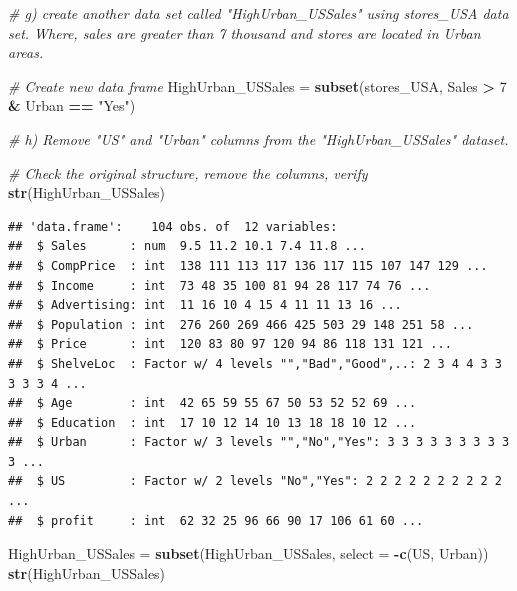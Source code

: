\documentclass[
]{article}
\newenvironment{Shaded}{\begin{snugshade}}{\end{snugshade}}
\newcommand{\AttributeTok}[1]{\textcolor[rgb]{0.13,0.29,0.53}{#1}}
\newcommand{\CommentTok}[1]{\textcolor[rgb]{0.56,0.35,0.01}{\textit{#1}}}
\newcommand{\DecValTok}[1]{\textcolor[rgb]{0.00,0.00,0.81}{#1}}
\newcommand{\FunctionTok}[1]{\textcolor[rgb]{0.13,0.29,0.53}{\textbf{#1}}}
\newcommand{\NormalTok}[1]{#1}
\newcommand{\OtherTok}[1]{\textcolor[rgb]{0.56,0.35,0.01}{#1}}
\newcommand{\SpecialCharTok}[1]{\textcolor[rgb]{0.81,0.36,0.00}{\textbf{#1}}}
\newcommand{\StringTok}[1]{\textcolor[rgb]{0.31,0.60,0.02}{#1}}
\begin{document}
\begin{Shaded}
\begin{Highlighting}[]
\CommentTok{\# g)  create another data set called "HighUrban\_USSales" using \textquotesingle{}stores\_USA\textquotesingle{} data set. Where, sales are greater than 7 thousand and stores are located in Urban areas.}
  
    \CommentTok{\# Create new data frame}
\NormalTok{  HighUrban\_USSales }\OtherTok{=} \FunctionTok{subset}\NormalTok{(stores\_USA, Sales }\SpecialCharTok{\textgreater{}} \DecValTok{7} \SpecialCharTok{\&}\NormalTok{ Urban }\SpecialCharTok{==} \StringTok{"Yes"}\NormalTok{)}
  

\CommentTok{\# h)  Remove "US" and "Urban" columns from the "HighUrban\_USSales" dataset.}
  
    \CommentTok{\# Check the original structure, remove the columns, verify  }
  \FunctionTok{str}\NormalTok{(HighUrban\_USSales)}
\end{Highlighting}
\end{Shaded}

\begin{verbatim}
## 'data.frame':    104 obs. of  12 variables:
##  $ Sales      : num  9.5 11.2 10.1 7.4 11.8 ...
##  $ CompPrice  : int  138 111 113 117 136 117 115 107 147 129 ...
##  $ Income     : int  73 48 35 100 81 94 28 117 74 76 ...
##  $ Advertising: int  11 16 10 4 15 4 11 11 13 16 ...
##  $ Population : int  276 260 269 466 425 503 29 148 251 58 ...
##  $ Price      : int  120 83 80 97 120 94 86 118 131 121 ...
##  $ ShelveLoc  : Factor w/ 4 levels "","Bad","Good",..: 2 3 4 4 3 3 3 3 3 4 ...
##  $ Age        : int  42 65 59 55 67 50 53 52 52 69 ...
##  $ Education  : int  17 10 12 14 10 13 18 18 10 12 ...
##  $ Urban      : Factor w/ 3 levels "","No","Yes": 3 3 3 3 3 3 3 3 3 3 ...
##  $ US         : Factor w/ 2 levels "No","Yes": 2 2 2 2 2 2 2 2 2 2 ...
##  $ profit     : int  62 32 25 96 66 90 17 106 61 60 ...
\end{verbatim}

\begin{Shaded}
\begin{Highlighting}[]
\NormalTok{  HighUrban\_USSales }\OtherTok{=} \FunctionTok{subset}\NormalTok{(HighUrban\_USSales, }\AttributeTok{select =} \SpecialCharTok{{-}}\FunctionTok{c}\NormalTok{(US, Urban))}
  \FunctionTok{str}\NormalTok{(HighUrban\_USSales)}
\end{Highlighting}
\end{Shaded}
\end{document}
